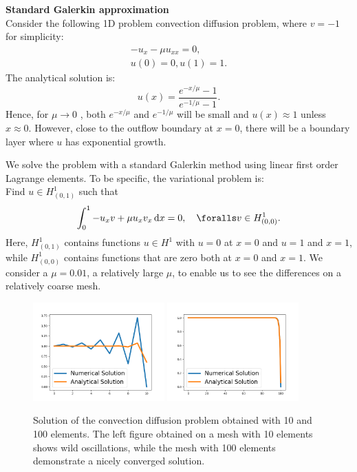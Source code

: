 \begin{example}{\textbf{Standard Galerkin approximation}} \label{ex1} \\
	Consider the following 1D problem convection diffusion problem, where $v=-1$ for simplicity: 
\begin{eqnarray}
-u_x - \mu u_{xx} = 0, \\ 
u(0) = 0, u(1) = 1 . 
\end{eqnarray}
The analytical solution is: 
\[
u(x) = \frac{e^{-x/\mu} - 1}{e^{-1/\mu} - 1}. 
\]
Hence, for $\mu \rightarrow 0$ , both $e^{-x/\mu}$ and $e^{-1/\mu}$ 
will be small and $u(x) \approx 1$ unless $x\approx 0$. However, close to the 
outflow boundary at $x=0$, there will be a boundary layer where $u$ has exponential growth. 

We solve the problem with a standard Galerkin method using linear first
order Lagrange elements. To be specific, the variational problem is: \\    
Find $u \in H^1_{(0,1)}$ such that 
\[
\int_0^1 -u_x v + \mu u_x v_x \dx   = 0, \quad \foralls v \in H^1_{(0,0)} .  
\]
Here, $H^1_{(0,1)}$ contains functions $u\in H^1$ with $u=0$ at $x=0$ and $u=1$ and $x=1$, while
$H^1_{(0,0)}$ contains functions that are zero both at $x=0$ and $x=1$. We
consider a $\mu=0.01$, a relatively large $\mu$, to enable us to see the
differences on a relatively coarse mesh.     

\begin{figure}
\begin{center}
\includegraphics[width=0.45\textwidth]{chapters/conv-diff/plots/conv-diff.png}
\includegraphics[width=0.45\textwidth]{chapters/conv-diff/plots/conv-diff-hr.png}
\caption{Solution of the convection diffusion problem obtained with 10 and 100 elements. 
The left figure obtained on a mesh with 10 elements shows wild oscillations, while the 
mesh with 100 elements demonstrate a nicely converged solution.}
\label{fig:conv1}
\end{center}
\end{figure}


\end{example}
